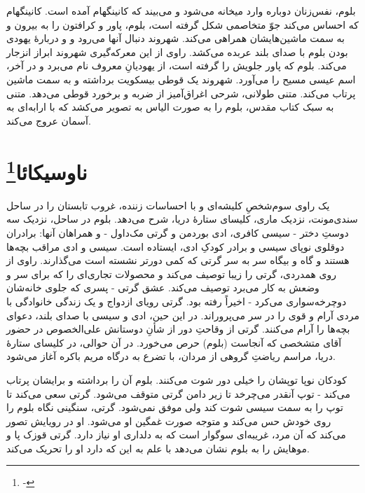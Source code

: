 \documentclass[12pt]{book}
\begin{document}
    بلوم، نفس‌زنان دوباره وارد میخانه می‌شود و می‌بیند که کانینگهام آمده است. کانینگهام که احساس می‌کند جوّ متخاصمی شکل گرفته است، بلوم، پاور و کرافتون را به بیرون و به سمت ماشین‌هایشان همراهی می‌کند. شهروند دنبال آنها می‌رود و و دربارۀ یهودی بودن بلوم با صدای بلند عربده می‌کشد. راوی از این معرکه‌گیری شهروند ابراز انزجار می‌کند. بلوم که پاور جلویش را گرفته است، از یهودیانِ معروف نام می‌برد و در آخر، اسم عیسی مسیح را می‌آورد. شهروند یک قوطی بیسکویت برداشته و به سمت ماشین پرتاب می‌کند. متنی طولانی، شرحی اغراق‌آمیز از ضربه و برخورد قوطی می‌دهد. متنی به سبک کتاب مقدس، بلوم را به صورت الیاس به تصویر می‌کشد که با ارابه‌ای به آسمان عروج می‌کند.

    \chapter[ناوسیکائا]{ناوسیکائا\protect\footnote{-}}\label{ep:13}
    یک راوی سوم‌شخصِ کلیشه‌ای و با احساسات زننده، غروب تابستان را در ساحل سندی‌مونت، نزدیک ماری، کلیسای ستارۀ دریا، شرح می‌دهد. بلوم در ساحل، نزدیک سه دوستِ دختر - سیسی کافری، ادی بوردمن و گرتی مک‌داول - و همراهان آنها: برادران دوقلوی نوپای سیسی و برادر کودکِ ادی، ایستاده است. سیسی و ادی مراقب بچه‌ها هستند و گاه و بیگاه سر به سر گرتی که کمی دورتر نشسته است می‌گذارند. راوی از روی همدردی، گرتی را زیبا توصیف می‌کند و محصولات تجاری‌ای را که برای سر و وضعش به کار می‌برد توصیف می‌کند. عشق گرتی - پسری که جلوی خانه‌شان دوچرخه‌سواری می‌کرد - اخیراً رفته بود. گرتی رویای ازدواج و یک زندگی خانوادگی با مردی آرام و قوی را در سر می‌پروراند. در این حین، ادی و سیسی با صدای بلند، دعوای بچه‌ها را آرام می‌کنند. گرتی از وقاحتِ دور از شأنِ دوستانش علی‌الخصوص در حضور آقای متشخصی که آنجاست (بلوم) حرص می‌خورد. در آن حوالی، در کلیسای ستارۀ دریا، مراسم ریاضتِ گروهی از مردان، با تضرع به درگاه مریم باکره آغاز می‌شود.

    کودکان نوپا توپشان را خیلی دور شوت می‌کنند. بلوم آن را برداشته و برایشان پرتاب می‌کند - توپ آنقدر می‌چرخد تا زیر دامن گرتی متوقف می‌شود. گرتی سعی می‌کند تا توپ را به سمت سیسی شوت کند ولی موفق نمی‌شود. گرتی، سنگینی نگاه بلوم را روی خودش حس می‌کند و متوجه صورت غمگین او می‌شود. او در رویایش تصور می‌کند که آن مرد، غریبه‌ای سوگوار است که به دلداری او نیاز دارد. گرتی قوزک پا و موهایش را به بلوم نشان می‌دهد با علم به این که دارد او را تحریک می‌کند.
\end{document}
